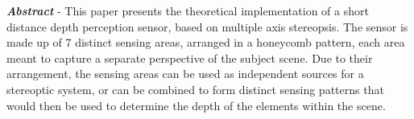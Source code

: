 \textbf{\textit{Abstract}} - This paper presents the theoretical implementation of a short distance
depth perception sensor, based on multiple axis stereopsis. The sensor is made up of \(7\) distinct 
sensing areas, arranged in a honeycomb pattern, each area meant to capture a separate perspective 
of the subject scene. Due to their arrangement, the sensing areas can be used as independent 
sources for a stereoptic system, or can be combined to form distinct sensing patterns that would
then be used to determine the depth of the elements within the scene.